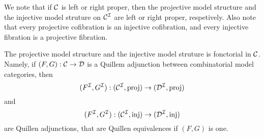 We note that if $\mathcal{C}$ is left or right proper, then the projective model structure and the injective model struture on $\mathcal{C}^{\mathcal{I}}$ 
are left or right proper, respetively. Also note that every projective cofibration is an injective cofibration, and every
injective fibration is a projective fibration.

The projective model structure and the injective model struture is fonctorial in $\mathcal{C}$. Namely, if $(F,G):\mathcal{C}\to\mathcal{D}$ is a 
Quillem adjunction between combinatorial model categories, then $$(F^{\mathcal{I}},G^{\mathcal{I}}):(\mathcal{C}^{\mathcal{I}},\text{proj})\to(\mathcal{D}^{\mathcal{I}},\text{proj})$$
and $$(F^{\mathcal{I}},G^{\mathcal{I}}):(\mathcal{C}^{\mathcal{I}},\text{inj})\to(\mathcal{D}^{\mathcal{I}},\text{inj})$$ are Quillen adjunctions, that are Quillen equivalences 
if $(F,G)$ is one.


\tbc

